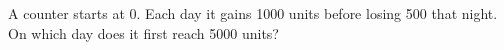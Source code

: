 A counter starts at 0. Each day it gains 1000 units before losing 500 that night. On which day does it first reach 5000 units?
